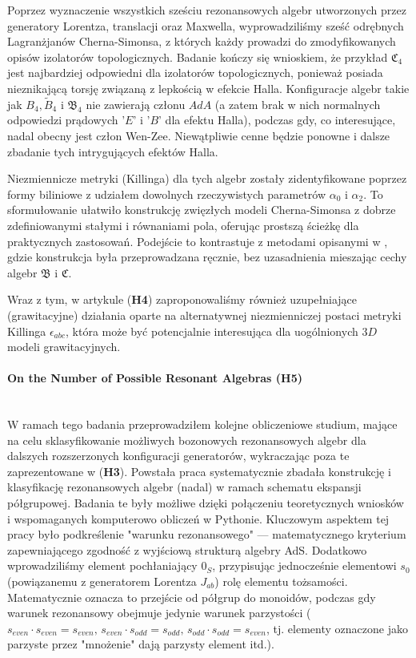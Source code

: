 \documentclass[12pt,a4paper]{article}
\newcommand{\myparagraph}[1]{\paragraph{#1}\mbox{}\\}
\begin{document}
Poprzez wyznaczenie wszystkich sześciu rezonansowych algebr utworzonych przez generatory Lorentza, translacji oraz Maxwella, wyprowadziliśmy sześć odrębnych Lagranżjanów Cherna-Simonsa, z których każdy prowadzi do zmodyfikowanych opisów izolatorów topologicznych. Badanie kończy się wnioskiem, że przykład $\mathfrak{C}_4$ jest najbardziej odpowiedni dla izolatorów topologicznych, ponieważ posiada nieznikającą torsję związaną z lepkością w efekcie Halla. Konfiguracje algebr takie jak $B_4,\tilde{B}_4$ i $\mathfrak{B}_4$ nie zawierają członu $AdA$ (a zatem brak w nich normalnych odpowiedzi prądowych '$E$' i '$B$' dla efektu Halla), podczas gdy, co interesujące, nadal obecny jest człon Wen-Zee. Niewątpliwie cenne będzie ponowne i dalsze zbadanie tych intrygujących efektów Halla.

Niezmiennicze metryki (Killinga) dla tych algebr zostały zidentyfikowane poprzez formy biliniowe z udziałem dowolnych rzeczywistych parametrów $\alpha_0$ i $\alpha_2$. To sformułowanie ułatwiło konstrukcję zwięzłych modeli Cherna-Simonsa z dobrze zdefiniowanymi stałymi i równaniami pola, oferując prostszą ścieżkę dla praktycznych zastosowań. Podejście to kontrastuje z metodami opisanymi w \cite{Palumbo:2016nku}, gdzie konstrukcja była przeprowadzana ręcznie, bez uzasadnienia mieszając cechy algebr $\mathfrak{B}$ i $\mathfrak{C}$.

Wraz z tym, w artykule (\textbf{H4}) zaproponowaliśmy również uzupełniające (grawitacyjne) działania oparte na alternatywnej niezmienniczej postaci metryki Killinga $\epsilon_{abc}$, która może być potencjalnie interesująca dla uogólnionych $3D$ modeli grawitacyjnych.

\myparagraph{On the Number of Possible Resonant Algebras (H5)} 

W ramach tego badania przeprowadziłem kolejne obliczeniowe studium, mające na celu sklasyfikowanie możliwych bozonowych rezonansowych algebr dla dalszych rozszerzonych konfiguracji generatorów, wykraczając poza te zaprezentowane w (\textbf{H3}). Powstała praca systematycznie zbadała konstrukcję i klasyfikację rezonansowych algebr (nadal) w ramach schematu ekspansji półgrupowej. Badania te były możliwe dzięki połączeniu teoretycznych wniosków i wspomaganych komputerowo obliczeń w Pythonie. Kluczowym aspektem tej pracy było podkreślenie "warunku rezonansowego" — matematycznego kryterium zapewniającego zgodność z wyjściową strukturą algebry AdS. Dodatkowo wprowadziliśmy element pochłaniający $0_S$, przypisując jednocześnie elementowi $s_0$ (powiązanemu z generatorem Lorentza $J_{ab}$) rolę elementu tożsamości. Matematycznie oznacza to przejście od półgrup do monoidów, podczas gdy warunek rezonansowy obejmuje jedynie warunek parzystości ($s_{even}\cdot s_{even}=s_{even},\, s_{even}\cdot s_{odd} = s_{odd},\, s_{odd}\cdot s_{odd}=s_{even}$, tj. elementy oznaczone jako parzyste przez "mnożenie" dają parzysty element itd.).
\end{document}
